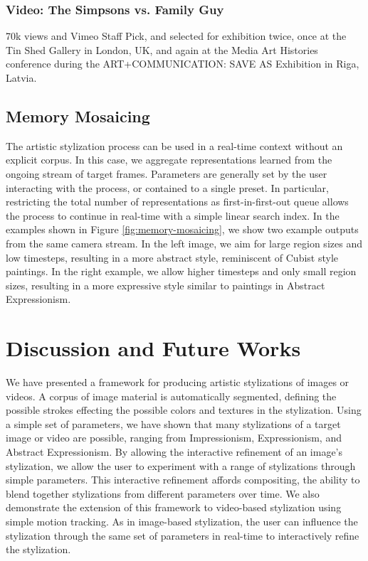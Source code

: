 \documentclass[a4paper,11pt,final]{ThesisStyle}
\begin{document}
\subsubsection{Video: The Simpsons vs. Family Guy}

70k views and Vimeo Staff Pick, and selected for exhibition twice, once at the Tin Shed Gallery in London, UK, and again at the Media Art Histories conference during the ART+COMMUNICATION: SAVE AS Exhibition in Riga, Latvia.

\subsection{Memory Mosaicing}\vspace{-0.4em}

The artistic stylization process can be used in a real-time context without an explicit corpus.  In this case, we aggregate representations learned from the ongoing stream of target frames.  Parameters are generally set by the user interacting with the process, or contained to a single preset.  In particular, restricting the total number of representations as first-in-first-out queue allows the process to continue in real-time with a simple linear search index.  In the examples shown in Figure \ref{fig:memory-mosaicing}, we show two example outputs from the same camera stream.  In the left image, we aim for large region sizes and low timesteps, resulting in a more abstract style, reminiscent of Cubist style paintings.  In the right example, we allow higher timesteps and only small region sizes, resulting in a more expressive style similar to paintings in Abstract Expressionism.  

\section{Discussion and Future Works}
We have presented a framework for producing artistic stylizations of images or videos.  A corpus of image material is automatically segmented, defining the possible strokes effecting the possible colors and textures in the stylization.  Using a simple set of parameters, we have shown that many stylizations of a target image or video are possible, ranging from Impressionism, Expressionism, and Abstract Expressionism.  By allowing the interactive refinement of an image's stylization, we allow the user to experiment with a range of stylizations through simple parameters.  This interactive refinement affords compositing, the ability to blend together stylizations from different parameters over time.  We also demonstrate the extension of this framework to video-based stylization using simple motion tracking.  As in image-based stylization, the user can influence the stylization through the same set of parameters in real-time to interactively refine the stylization.  
\end{document}
